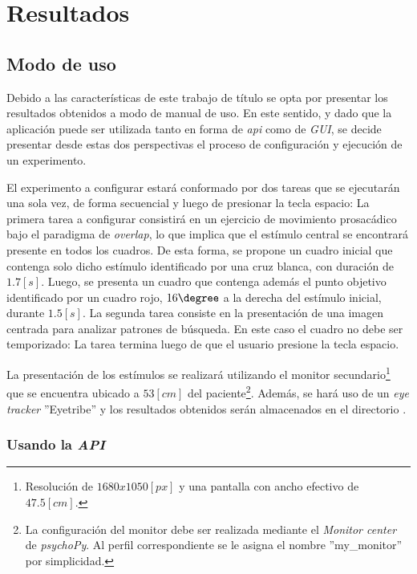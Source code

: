 \documentclass[\main/main.tex]{subfiles}
\begin{document}
\chapter{Resultados}
\label{cha:04_resultados}
    \section{Modo de uso}
    \label{sec:04_modo_uso}
        Debido a las características de este trabajo de título se opta por presentar los resultados obtenidos a modo de manual de uso. En este sentido, y dado que la aplicación puede ser utilizada tanto en forma de \textit{\acrshort{api}} como de \textit{GUI}, se decide presentar desde estas dos perspectivas el proceso de configuración y ejecución de un experimento.

        El experimento a configurar estará conformado por dos tareas que se ejecutarán una sola vez, de forma secuencial y luego de presionar la tecla espacio: La primera tarea a configurar consistirá en un ejercicio de movimiento prosacádico bajo el paradigma de \textit{overlap}, lo que implica que el estímulo central se encontrará presente en todos los cuadros. De esta forma, se propone un cuadro inicial que contenga solo dicho estímulo identificado por una cruz blanca, con duración de $1.7[s]$. Luego, se presenta un cuadro que contenga además el punto objetivo identificado por un cuadro rojo, $16\degree$ a la derecha del estímulo inicial, durante $1.5[s]$. La segunda tarea consiste en la presentación de una imagen centrada para analizar patrones de búsqueda. En este caso el cuadro no debe ser temporizado: La tarea termina luego de que el usuario presione la tecla espacio. 

        La presentación de los estímulos se realizará utilizando el monitor secundario\footnote{Resolución de $1680x1050[px]$ y una pantalla con ancho efectivo de $47.5[cm]$.} que se encuentra ubicado a $53[cm]$ del paciente\footnote{La configuración del monitor debe ser realizada mediante el \textit{Monitor center} de \textit{psychoPy}. Al perfil correspondiente se le asigna el nombre ''my\_monitor'' por simplicidad.}. Además, se hará uso de un \textit{eye tracker} ''Eyetribe'' y los resultados obtenidos serán almacenados en el directorio .

        \newpage
        \subsection{Usando la \textit{API}}
\end{document}
